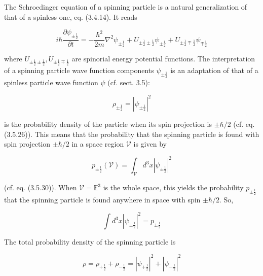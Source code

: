 \documentclass{article}
\begin{document}
The Schroedinger equation of a spinning particle is a natural generalization of that of a spinless one, eq. (3.4.14). It reads
 
\begin{equation*}
i \hbar \frac{\partial \psi_{ \pm \frac{1}{2}}}{\partial t}=-\frac{\hbar^{2}}{2 m} \nabla^{2} \psi_{ \pm \frac{1}{2}}+U_{ \pm \frac{1}{2} \pm \frac{1}{2}} \psi_{ \pm \frac{1}{2}}+U_{ \pm \frac{1}{2} \mp \frac{1}{2}} \psi_{\mp \frac{1}{2}} \tag{3.21.1}
\end{equation*}
 
where $U_{ \pm \frac{1}{2} \pm \frac{1}{2}}, U_{ \pm \frac{1}{2} \mp \frac{1}{2}}$ are spinorial energy potential functions.
The interpretation of a spinning particle wave function components $\psi_{ \pm \frac{1}{2}}$ is an adaptation of that of a spinless particle wave function $\psi$ (cf. sect. 3.5):
 
\begin{equation*}
\rho_{ \pm \frac{1}{2}}=\left|\psi_{ \pm \frac{1}{2}}\right|^{2} \tag{3.21.2}
\end{equation*}
 
is the probability density of the particle when its spin projection is $\pm \hbar / 2$ (cf. eq. (3.5.26)). This means that the probability that the spinning particle is found with spin projection $\pm \hbar / 2$ in a space region $\mathcal{V}$ is given by
 
\begin{equation*}
p_{ \pm \frac{1}{2}}(\mathcal{V})=\int_{\mathcal{V}} d^{3} x\left|\psi_{ \pm \frac{1}{2}}\right|^{2} \tag{3.21.3}
\end{equation*}
 
(cf. eq. (3.5.30)). When $\mathcal{V}=\mathbb{E}^{3}$ is the whole space, this yields the probability $p_{ \pm \frac{1}{2}}$ that the spinning particle is found anywhere in space with spin $\pm \hbar / 2$. So,
 
\begin{equation*}
\int d^{3} x\left|\psi_{ \pm \frac{1}{2}}\right|^{2}=p_{ \pm \frac{1}{2}} \tag{3.21.4}
\end{equation*}
 

The total probability density of the spinning particle is
 
\begin{equation*}
\rho=\rho_{+\frac{1}{2}}+\rho_{-\frac{1}{2}}=\left|\psi_{+\frac{1}{2}}\right|^{2}+\left|\psi_{-\frac{1}{2}}\right|^{2} \tag{3.21.5}
\end{equation*}
 
\end{document}
